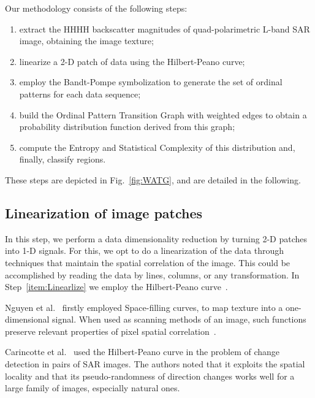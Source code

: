 \documentclass[journal]{IEEEtran}
\begin{document}
Our methodology consists of the following steps:
\begin{enumerate}
        \item \label{item:texture} extract the HHHH backscatter magnitudes of quad-polarimetric L-band SAR image, obtaining the image texture;
       \item\label{item:Linearlize} linearize a 2-D patch of data using the Hilbert-Peano curve;
        \item \label{item:Symbolization} employ the Bandt-Pompe symbolization to generate the set of ordinal patterns for each data sequence;
       \item\label{item:WOPTG} build the Ordinal Pattern Transition Graph with weighted edges to obtain a probability distribution function derived from this graph;
       \item\label{item:Descriptors} compute the Entropy and Statistical Complexity of this distribution and, finally, classify  regions.
\end{enumerate}
These steps are depicted in Fig.~\ref{fig:WATG}, and are detailed in the following.

\subsection{Linearization of image patches}\label{linearization}

In this step, we perform a data dimensionality reduction by turning 2-D patches into 1-D signals.
For this, we opt to do a linearization of the data through techniques that maintain the spatial correlation of the image.
This could be accomplished by reading the data by lines, columns, or any transformation.
In Step~\ref{item:Linearlize} we employ the Hilbert-Peano curve~\cite{Lee1994Texture}.

Nguyen et al.~\cite{nguyen1982space} firstly employed Space-filling curves,
to map texture into a one-dimensional signal.
When used as scanning methods of an image, such functions preserve relevant properties of pixel spatial correlation~\cite{Lee1994Texture}.

Carincotte et al.~\cite{UnsupervisedChangeDetectiononSARImagesUsingFuzzyHiddenMarkovChains} used the Hilbert-Peano curve in the problem of change detection in pairs of SAR images.
The authors noted that it exploits the spatial locality and that its pseudo-randomness
 of direction changes works well for a large family of images, especially
natural ones.
\end{document}
